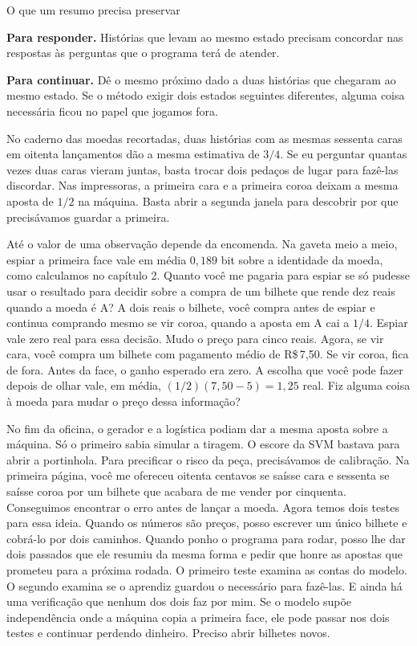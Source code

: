 \documentclass[12pt,oneside]{article}
\newcommand{\itemq}[1]{\par\textbf{#1.}\enspace}
\newcommand{\bookanchor}[1]{\phantomsection\label{#1}}
\begin{document}
\begin{quadro}{O que um resumo precisa preservar}
\itemq{Para responder} Histórias que levam ao mesmo estado precisam concordar nas respostas às perguntas que o programa terá de atender.
\itemq{Para continuar} Dê o mesmo próximo dado a duas histórias que chegaram ao mesmo estado. Se o método exigir dois estados seguintes diferentes, alguma coisa necessária ficou no papel que jogamos fora.
\end{quadro}

No caderno das moedas recortadas, duas histórias com as mesmas sessenta caras em oitenta lançamentos dão a mesma estimativa de $3/4$. Se eu perguntar quantas vezes duas caras vieram juntas, basta trocar dois pedaços de lugar para fazê-las discordar. Nas impressoras, a primeira cara e a primeira coroa deixam a mesma aposta de $1/2$ na máquina. Basta abrir a segunda janela para descobrir por que precisávamos guardar a primeira.

Até\bookanchor{topic-07-3} o valor de uma observação depende da encomenda. Na gaveta meio a meio, espiar a primeira face vale em média $0{,}189$ bit sobre a identidade da moeda, como calculamos no capítulo 2. Quanto você me pagaria para espiar se só pudesse usar o resultado para decidir sobre a compra de um bilhete que rende dez reais quando a moeda é A? A dois reais o bilhete, você compra antes de espiar e continua comprando mesmo se vir coroa, quando a aposta em A cai a $1/4$. Espiar vale zero real para essa decisão. Mudo o preço para cinco reais. Agora, se vir cara, você compra um bilhete com pagamento médio de R\$\,7,50. Se vir coroa, fica de fora. Antes da face, o ganho esperado era zero. A escolha que você pode fazer depois de olhar vale, em média, $(1/2)(7{,}50-5)=1{,}25$ real. Fiz alguma coisa à moeda para mudar o preço dessa informação?

No fim da oficina, o gerador e a logística podiam dar a mesma aposta sobre a máquina. Só o primeiro sabia simular a tiragem. O escore da SVM bastava para abrir a portinhola. Para precificar o risco da peça, precisávamos de calibração. Na primeira página, você me ofereceu oitenta centavos se saísse cara e sessenta se saísse coroa por um bilhete que acabara de me vender por cinquenta. Conseguimos encontrar o erro antes de lançar a moeda. Agora temos dois testes para essa ideia. Quando os números são preços, posso escrever um único bilhete e cobrá-lo por dois caminhos. Quando ponho o programa para rodar, posso lhe dar dois passados que ele resumiu da mesma forma e pedir que honre as apostas que prometeu para a próxima rodada. O primeiro teste examina as contas do modelo. O segundo examina se o aprendiz guardou o necessário para fazê-las. E ainda há uma verificação que nenhum dos dois faz por mim. Se o modelo supõe independência onde a máquina copia a primeira face, ele pode passar nos dois testes e continuar perdendo dinheiro. Preciso abrir bilhetes novos.
\end{document}
